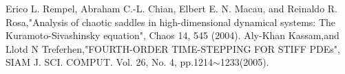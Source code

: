 \documentclass[autodetect-engine,dvipdfmx-if-dvi,ja=standard,a4paper,11pt]{bxjsarticle} %
\begin{document}









\begin{thebibliography}{9999}%
Erico L. Rempel, Abraham C.-L. Chian, Elbert E. N. Macau, and Reinaldo R. Rosa,"Analysis
of chaotic saddles in high-dimensional dynamical systems: The Kuramoto-Sivashinsky equation",
Chaos 14, 545 (2004).
Aly-Khan Kassam,and Llotd N Treferhen,"FOURTH-ORDER TIME-STEPPING FOR STIFF
PDEs", SIAM J. SCI. COMPUT. Vol. 26, No. 4, pp.1214$\sim$1233(2005).
\end{thebibliography}

\end{document}

